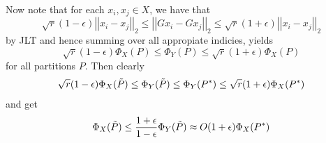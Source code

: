 \documentclass[12pt]{report}
\newcommand{\norm}[1]{\left|\left|#1\right|\right|}
\begin{document}
Now note that for each $x_i,x_j \in X$, we have that
\begin{equation*}
  \sqrt{r}(1 - \epsilon) \norm{x_i - x_j}_2 \leq \norm{Gx_i - Gx_j}_2 \leq \sqrt{r}(1 + \epsilon) \norm{x_i - x_j}_2
\end{equation*}
by JLT and hence summing over all appropiate indicies, yields
\begin{equation*}
  \sqrt{r}(1-\epsilon)\Phi_X(P) \leq \Phi_Y(P) \leq \sqrt{r}(1 + \epsilon) \Phi_X(P)
\end{equation*}
for all partitions $P$. Then clearly
\begin{equation*}
  \sqrt{r}(1-\epsilon)\Phi_X(\Tilde{P}) \leq \Phi_Y(\Tilde{P}) \leq \Phi_{Y}(P^*) \leq \sqrt{r}(1 + \epsilon) \Phi_X(P^*)
\end{equation*}
and get
\begin{equation*}
  \Phi_X(\Tilde{P}) \leq \frac{1 + \epsilon}{1 - \epsilon} \Phi_Y(\Tilde{P}) \approx O(1 + \epsilon) \Phi_X(P^*)
\end{equation*}
\end{document}

